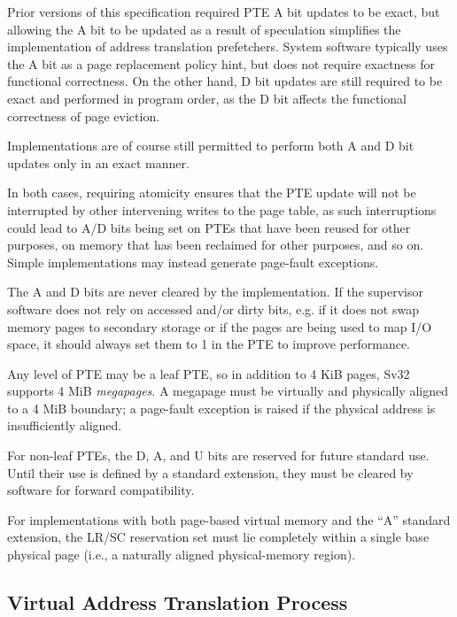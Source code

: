 \begin{commentary}
Prior versions of this specification required PTE A bit updates to be exact,
but allowing the A bit to be updated as a result of speculation simplifies
the implementation of address translation prefetchers.  System software
typically uses the A bit as a page replacement policy hint, but does not
require exactness for functional correctness.  On the other hand, D bit updates
are still required to be exact and performed in program order, as the D bit
affects the functional correctness of page eviction.

Implementations are of course still permitted to perform both A and D bit
updates only in an exact manner.

In both cases, requiring atomicity ensures that the PTE update will not be
interrupted by other intervening writes to the page table, as such interruptions
could lead to A/D bits being set on PTEs that have been reused for other
purposes, on memory that has been reclaimed for other purposes, and so on.
Simple implementations may instead generate page-fault exceptions.

The A and D bits are never cleared by the implementation.  If the
supervisor software does not rely on accessed and/or dirty bits,
e.g. if it does not swap memory pages to secondary storage or if the
pages are being used to map I/O space, it should always set them to 1
in the PTE to improve performance.
\end{commentary}

Any level of PTE may be a leaf PTE, so in addition to 4 KiB pages, Sv32
supports 4 MiB {\em megapages}.  A megapage must be virtually and
physically aligned to a 4 MiB boundary; a page-fault exception is raised
if the physical address is insufficiently aligned.

For non-leaf PTEs, the D, A, and U bits are reserved for future standard
use.  Until their use is defined by a standard extension, they
must be cleared by software for forward compatibility.

For implementations with both page-based virtual memory and the ``A'' standard
extension, the LR/SC reservation set must lie completely within a single
base physical page (i.e., a naturally aligned 
physical-memory region).

\subsection{Virtual Address Translation Process}
\label{sv32algorithm}

